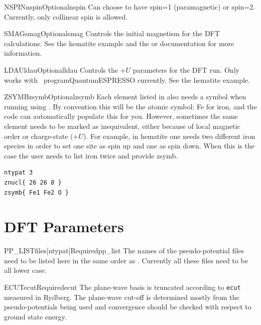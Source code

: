 \documentclass[11pt]{report}
\begin{document}
\begin{Card}{NSPIN}{nspin}{Optional}{nspin}
Can choose to have spin=1 (paramagnetic) or spin=2. Currently, only collinear spin is allowed.
\end{Card}

\begin{Card}{SMAG}{smag}{Optional}{smag}
Controls the initial magnetism for the DFT calculations. See the hematite example and the  or  documentation for more information.
\end{Card}

\begin{Card}{LDAU}{ldau}{Optional}{ldau}
Controls the $+U$ parameters for the DFT run. Only works with \
program{QuantumESPRESSO} currently. See the hematite example.
\end{Card}

\begin{Card}{ZSYMB}{zsymb}{Optional}{zsymb}
Each element listed in  also needs a symbol when running using .
By convention this will be the atomic symbol: Fe for iron, and the code can automatically populate this for you.
However, sometimes the same element needs to be marked as inequivalent, either because of local magnetic order or charge-state ($+U$). 
For example, in hematite one needs two different iron species in order to set one site as spin up and one as spin down.
When this is the case the user needs to list iron twice \htmlref{ZNUCL}{card:znucl} and provide zsymb.

\begin{verbatim}
ntypat 3
znucl{ 26 26 8 }
zsymb{ Fe1 Fe2 O }
\end{verbatim}
\end{Card}

\section{DFT Parameters}
\label{sec:DFT-Parameters}


\begin{Card}{PP\_LIST}{files[ntypat]}{Required}{pp_list}
The names of the pseudo-potential files need to be listed here in the same order as . Currently all these files need to be all lower case.
\end{Card}

\begin{Card}{ECUT}{ecut}{Required}{ecut}
The plane-wave basis is truncated according to \texttt{ecut} measured in Rydberg. The plane-wave cut-off is determined mostly from the pseudo-potentials being used and convergence should be checked with respect to ground state energy.
\end{Card}
\end{document}
